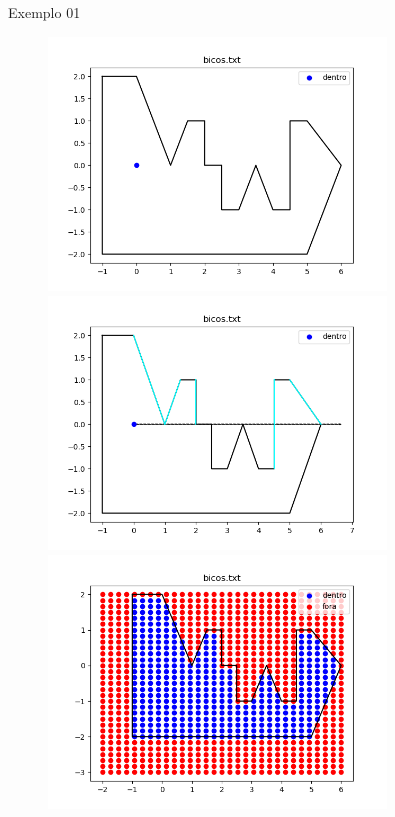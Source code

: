 \documentclass[aspectratio=169]{beamer}
\begin{document}
\begin{frame}{Exemplo 01}
  \begin{center}
    \begin{figure}
      \begin{overprint}
        \includegraphics[width=0.8\textwidth]{figures/bicos.png}
        \includegraphics[width=0.8\textwidth]{figures/bicos_marcados.png}
        \includegraphics[width=0.8\textwidth]{figures/bicos_grid.png}
      \end{overprint}
    \end{figure}
  \end{center}
\end{frame}
\end{document}
